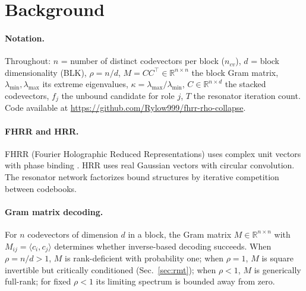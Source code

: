 \documentclass[11pt,a4paper]{article}
\begin{document}
\section{Background}
\label{sec:background}

\paragraph{Notation.} Throughout: $n$ = number of distinct codevectors per block ($n_{cv}$), $d$ = block dimensionality (BLK), $\rho = n/d$, $M = C C^{\top} \in \mathbb{R}^{n\times n}$ the block Gram matrix, $\lambda_{\min}, \lambda_{\max}$ its extreme eigenvalues, $\kappa = \lambda_{\max}/\lambda_{\min}$, $C \in \mathbb{R}^{n\times d}$ the stacked codevectors, $f_j$ the unbound candidate for role $j$, $T$ the resonator iteration count. Code available at \url{https://github.com/Rylow999/fhrr-rho-collapse}.

\paragraph{FHRR and HRR.} FHRR (Fourier Holographic Reduced Representations) uses complex unit vectors with phase binding \citep{plate1995holographic}. HRR uses real Gaussian vectors with circular convolution. The resonator network \citep{frady2020resonator} factorizes bound structures by iterative competition between codebooks.

\paragraph{Gram matrix decoding.} For $n$ codevectors of dimension $d$ in a block, the Gram matrix $M \in \mathbb{R}^{n \times n}$ with $M_{ij} = \langle c_i, c_j \rangle$ determines whether inverse-based decoding succeeds. When $\rho = n/d > 1$, $M$ is rank-deficient with probability one; when $\rho = 1$, $M$ is square invertible but critically conditioned (Sec.~\ref{sec:rmt}); when $\rho < 1$, $M$ is generically full-rank; for fixed $\rho<1$ its limiting spectrum is bounded away from zero.
\end{document}
